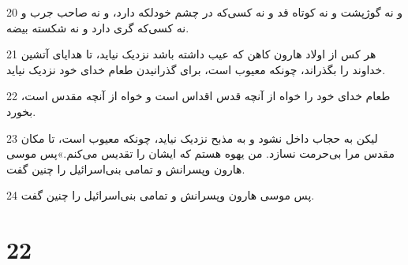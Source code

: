 \par 20 و نه گوژپشت و نه کوتاه قد و نه کسی‌که در چشم خودلکه دارد، و نه صاحب جرب و نه کسی‌که گری دارد و نه شکسته بیضه.
\par 21 هر کس از اولاد هارون کاهن که عیب داشته باشد نزدیک نیاید، تا هدایای آتشین خداوند را بگذراند، چونکه معیوب است، برای گذرانیدن طعام خدای خود نزدیک نیاید.
\par 22 طعام خدای خود را خواه از آنچه قدس اقداس است و خواه از آنچه مقدس است، بخورد.
\par 23 لیکن به حجاب داخل نشود و به مذبح نزدیک نیاید، چونکه معیوب است، تا مکان مقدس مرا بی‌حرمت نسازد. من یهوه هستم که ایشان را تقدیس می‌کنم.»پس موسی هارون وپسرانش و تمامی بنی‌اسرائیل را چنین گفت.
\par 24 پس موسی هارون وپسرانش و تمامی بنی‌اسرائیل را چنین گفت.
 
\chapter{22}

